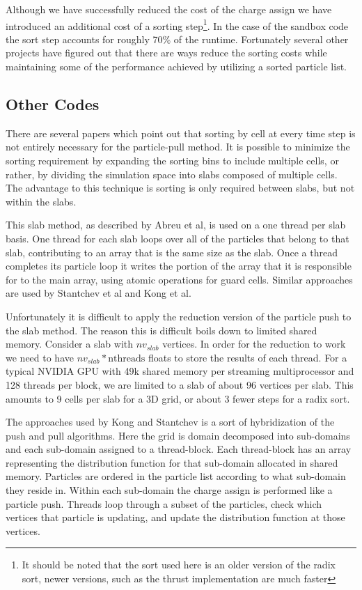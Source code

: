 Although we have successfully reduced the cost of the charge assign we have introduced an additional cost of a sorting step\footnote{It should be noted that the sort used here is an older version of the radix sort, newer versions, such as the thrust implementation are much faster}. In the case of the sandbox code the sort step accounts for roughly 70\% of the runtime. Fortunately several other projects have figured out that there are ways reduce the sorting costs while maintaining some of the performance achieved by utilizing a sorted particle list. 

 
		\subsection{Other Codes}
There are several papers which point out that sorting by cell at every time step is not entirely necessary for the particle-pull method. It is possible to minimize the sorting requirement by expanding the sorting bins to include multiple cells, or rather, by dividing the simulation space into slabs composed of multiple cells. The advantage to this technique is sorting is only required between slabs, but not within the slabs.\cite{Abreu2011} 

This slab method, as described by Abreu et al, is used on a one thread per slab basis. One thread for each slab loops over all of the particles that belong to that slab, contributing to an array that is the same size as the slab. Once a thread completes its particle loop it writes the portion of the array that it is responsible for to the main array, using atomic operations for guard cells.\cite{Abreu2011} Similar approaches are used by Stantchev et al and Kong et al.\cite{Stantchev2008}\cite{Kong2011}

Unfortunately it is difficult to apply the reduction version of the particle push to the slab method. The reason this is difficult boils down to limited shared memory. Consider a slab with $nv_{slab}$ vertices. In order for the reduction to work we need to have $nv_{slab} * \mathrm{nthreads}$ floats to store the results of each thread. For a typical NVIDIA GPU with 49k shared memory per streaming multiprocessor and 128 threads per block, we are limited to a slab of about 96 vertices per slab. This amounts to 9 cells per slab for a 3D grid, or about 3 fewer steps for a radix sort.

The approaches used by Kong and Stantchev is a sort of hybridization of the push and pull algorithms. Here the grid is domain decomposed into sub-domains and each sub-domain assigned to a thread-block. Each thread-block has an array representing the distribution function for that sub-domain allocated in shared memory. Particles are ordered in the particle list according to what sub-domain they reside in. Within each sub-domain the charge assign is performed like a particle push. Threads loop through a subset of the particles, check which vertices that particle is updating, and update the distribution function at those vertices. 

